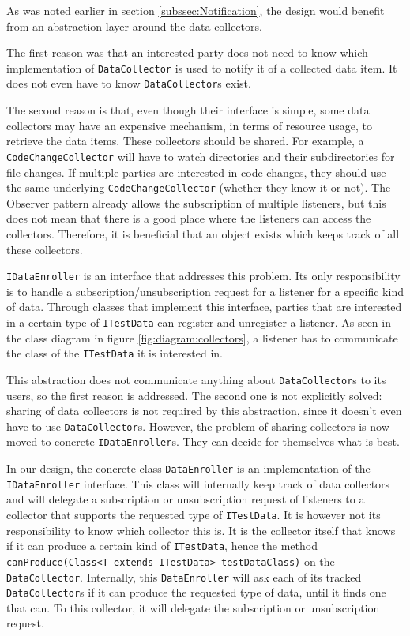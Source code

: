 \documentclass[i2]{oss}
\newcommand{\class}[1]{\texttt{#1}}
\newcommand{\method}[1]{\texttt{#1}}
\begin{document}
As was noted earlier in section \ref{subssec:Notification}, the design would benefit from an abstraction layer around the data collectors.

The first reason was that an interested party does not need to know which implementation of \class{DataCollector} is used to notify it of a collected data item. It does not even have to know \class{DataCollector}s exist.

The second reason is that, even though their interface is simple,
some data collectors may have an expensive mechanism, in terms of resource usage, to retrieve the data items.
These collectors should be shared.
For example, a \class{CodeChangeCollector} will have to watch directories and their subdirectories for file changes.
If multiple parties are interested in code changes, they should use the same underlying \class{CodeChangeCollector} (whether they know it or not).
The Observer pattern already allows the subscription of multiple listeners, but this does not mean that there is a good place where the listeners can access the collectors. 
Therefore, it is beneficial that an object exists which keeps track of all these collectors.

\class{IDataEnroller} is an interface that addresses this problem. 
Its only responsibility is to handle a subscription/unsubscription request for a listener for a specific kind of data.
Through classes that implement this interface, parties that are interested in a certain type of \class{ITestData} can register and unregister a listener.
As seen in the class diagram in figure \ref{fig:diagram:collectors}, a listener has to communicate the class of the \class{ITestData} it is interested in.

This abstraction does not communicate anything about \class{DataCollector}s to its users, so the first reason is addressed.
The second one is not explicitly solved: sharing of data collectors is not required by this abstraction, since it doesn't even have to use \class{DataCollector}s.
However, the problem of sharing collectors is now moved to concrete \class{IDataEnroller}s.
They can decide for themselves what is best.

In our design, the concrete class \class{DataEnroller} is an implementation of the \class{IDataEnroller} interface.
This class will internally keep track of data collectors and will delegate a subscription or unsubscription request of listeners to a collector that supports the requested type of \class{ITestData}.
It is however not its responsibility to know which collector this is.
It is the collector itself that knows if it can produce a certain kind of \class{ITestData}, hence the method \method{canProduce(Class<T extends ITestData> testDataClass)} on the \class{DataCollector}.
Internally, this \class{DataEnroller} will ask each of its tracked \class{DataCollector}s if it can produce the requested type of data, until it finds one that can.
To this collector, it will delegate the subscription or unsubscription request.
\end{document}
